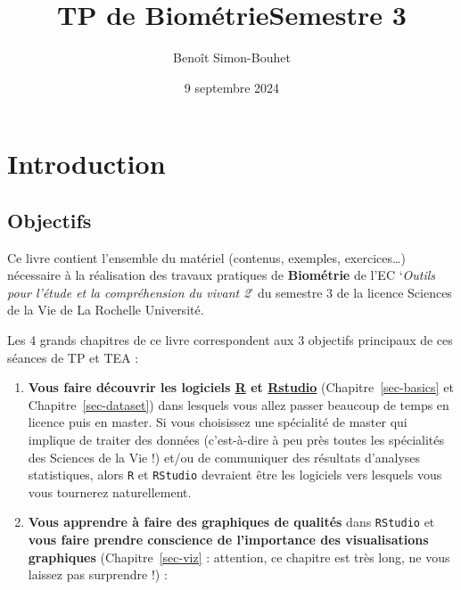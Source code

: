 \documentclass[
  a4paper,
  DIV=11,
  numbers=noendperiod,
  oneside]{scrreprt}
\title{TP de BiométrieSemestre 3}
\author{Benoît Simon-Bouhet}
\date{9 septembre 2024}
\renewcommand*\contentsname{Table des matières}
\newcommand\contentsname{Table des matières}
\begin{document}
\maketitle

\renewcommand*\contentsname{Table des matières}
{
\hypersetup{linkcolor=}
\setcounter{tocdepth}{2}
\tableofcontents
}

\chapter*{Introduction}\label{introduction}


\section*{Objectifs}\label{objectifs}


Ce livre contient l'ensemble du matériel (contenus, exemples,
exercices\ldots) nécessaire à la réalisation des travaux pratiques de
\textbf{Biométrie} de l'EC `\emph{Outils pour l'étude et la
compréhension du vivant 2}' du semestre 3 de la licence Sciences de la
Vie de La Rochelle Université.

Les 4 grands chapitres de ce livre correspondent aux 3 objectifs
principaux de ces séances de TP et TEA :

\begin{enumerate}
\def\labelenumi{\arabic{enumi}.}
\item
  \textbf{Vous faire découvrir les logiciels
  \href{https://cran.r-project.org}{R} et
  \href{https://www.rstudio.com}{Rstudio}} (Chapitre~\ref{sec-basics} et
  Chapitre~\ref{sec-dataset}) dans lesquels vous allez passer beaucoup
  de temps en licence puis en master. Si vous choisissez une spécialité
  de master qui implique de traiter des données (c'est-à-dire à peu près
  toutes les spécialités des Sciences de la Vie !) et/ou de communiquer
  des résultats d'analyses statistiques, alors \texttt{R} et
  \texttt{RStudio} devraient être les logiciels vers lesquels vous vous
  tournerez naturellement.
\item
  \textbf{Vous apprendre à faire des graphiques de qualités} dans
  \texttt{RStudio} et \textbf{vous faire prendre conscience de
  l'importance des visualisations graphiques} (Chapitre~\ref{sec-viz} :
  attention, ce chapitre est très long, ne vous laissez pas surprendre
  !) :
\end{enumerate}
\end{document}
